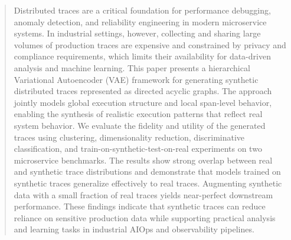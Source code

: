 \documentclass[sigconf,review]{acmart}
\begin{document}
\begin{abstract}



Distributed traces are a critical foundation for performance debugging, anomaly detection, and reliability engineering in modern microservice systems. In industrial settings, however, collecting and sharing large volumes of production traces are expensive and constrained by privacy and compliance requirements, which limits their availability for data-driven analysis and machine learning.
This paper presents a hierarchical Variational Autoencoder (VAE) framework for generating synthetic distributed traces represented as directed acyclic graphs. The approach jointly models global execution structure and local span-level behavior, enabling the synthesis of realistic execution patterns that reflect real system behavior.
We evaluate the fidelity and utility of the generated traces using clustering, dimensionality reduction, discriminative classification, and train-on-synthetic-test-on-real experiments on two microservice benchmarks. The results show strong overlap between real and synthetic trace distributions and demonstrate that models trained on synthetic traces generalize effectively to real traces. Augmenting synthetic data with a small fraction of real traces yields near-perfect downstream performance.
These findings indicate that synthetic traces can reduce reliance on sensitive production data while supporting practical analysis and learning tasks in industrial AIOps and observability pipelines.
\end{abstract}
\end{document}
